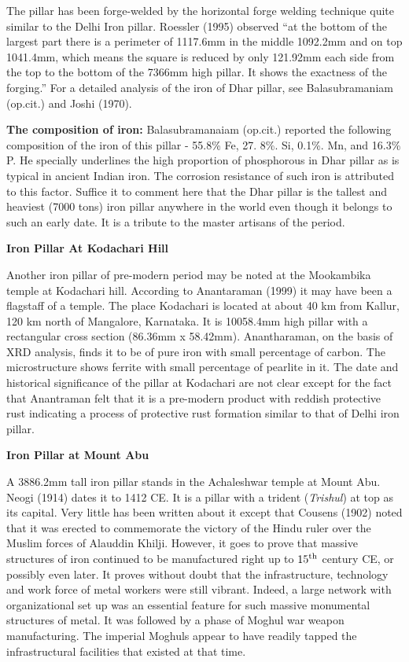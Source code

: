The pillar has been forge-welded by the horizontal forge welding technique quite similar to the Delhi Iron pillar. Roessler (1995) observed “at the bottom of the largest part there is a perimeter of 1117.6mm in the middle 1092.2mm and on top 1041.4mm, which means the square is reduced by only 121.92mm each side from the top to the bottom of the 7366mm high pillar. It shows the exactness of the forging.” For a detailed analysis of the iron of Dhar pillar, see Balasubramaniam (op.cit.) and Joshi (1970).

\textbf{The composition of iron:} Balasubramanaiam (op.cit.) reported the following composition of the iron of this pillar - 55.8\% Fe, 27. 8\%. Si, 0.1\%. Mn, and 16.3\% P. He specially underlines the high proportion of phosphorous in Dhar pillar as is typical in ancient Indian iron. The corrosion resistance of such iron is attributed to this factor. Suffice it to comment here that the Dhar pillar is the tallest and heaviest (7000 tons) iron pillar anywhere in the world even though it belongs to such an early date. It is a tribute to the master artisans of the period.

\noindent \textbf{\large Iron Pillar At Kodachari Hill}

Another iron pillar of pre-modern period may be noted at the Mookambika temple at Kodachari hill. According to Anantaraman (1999) it may have been a flagstaff of a temple. The place Kodachari is located at about 40 km from Kallur, 120 km north of Mangalore, Karnataka. It is 10058.4mm high pillar with a rectangular cross section (86.36mm x 58.42mm). Anantharaman, on the basis of XRD analysis, finds it to be of pure iron with small percentage of carbon. The microstructure shows ferrite with small percentage of pearlite in it. The date and historical significance of the pillar at Kodachari are not clear except for the fact that Anantraman felt that it is a pre-modern product with reddish protective rust indicating a process of protective rust formation similar to that of Delhi iron pillar.

\noindent \textbf{\large Iron Pillar at Mount Abu}

A 3886.2mm tall iron pillar stands in the Achaleshwar temple at Mount Abu. Neogi (1914) dates it to 1412 CE. It is a pillar with a trident ({\it Trishul}) at top as its capital. Very little has been written about it except that Cousens (1902) noted that it was erected to commemorate the victory of the Hindu ruler over the Muslim forces of Alauddin Khilji. However, it goes to prove that massive structures of iron continued to be manufactured right up to $15^{\rm th}$ century CE, or possibly even later. It proves without doubt that the infrastructure, technology and work force of metal workers were still vibrant. Indeed, a large network with organizational set up was an essential feature for such massive monumental structures of metal. It was followed by a phase of Moghul war weapon manufacturing. The imperial Moghuls appear to have readily tapped the infrastructural facilities that existed at that time.

